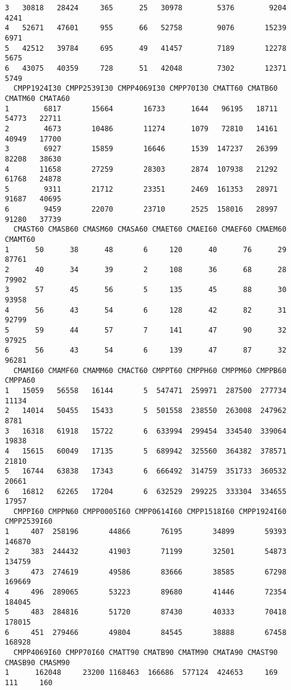 \documentclass[
  letterpaper,
  DIV=11,
  numbers=noendperiod]{scrreprt}
\begin{document}
\begin{verbatim}
3   30818   28424     365      25   30978        5376        9204        4241
4   52671   47601     955      66   52758        9076       15239        6971
5   42512   39784     695      49   41457        7189       12278        5675
6   43075   40359     728      51   42048        7302       12371        5749
  CMPP1924I30 CMPP2539I30 CMPP4069I30 CMPP70I30 CMATT60 CMATB60 CMATM60 CMATA60
1        6817       15664       16733      1644   96195   18711   54773   22711
2        4673       10486       11274      1079   72810   14161   40949   17700
3        6927       15859       16646      1539  147237   26399   82208   38630
4       11658       27259       28303      2874  107938   21292   61768   24878
5        9311       21712       23351      2469  161353   28971   91687   40695
6        9459       22070       23710      2525  158016   28997   91280   37739
  CMAST60 CMASB60 CMASM60 CMASA60 CMAET60 CMAEI60 CMAEF60 CMAEM60 CMAMT60
1      50      38      48       6     120      40      76      29   87761
2      40      34      39       2     108      36      68      28   79902
3      57      45      56       5     135      45      88      30   93958
4      56      43      54       6     128      42      82      31   92799
5      59      44      57       7     141      47      90      32   97925
6      56      43      54       6     139      47      87      32   96281
  CMAMI60 CMAMF60 CMAMM60 CMACT60 CMPPT60 CMPPH60 CMPPM60 CMPPB60 CMPPA60
1   15059   56558   16144       5  547471  259971  287500  277734   11134
2   14014   50455   15433       5  501558  238550  263008  247962    8781
3   16318   61918   15722       6  633994  299454  334540  339064   19838
4   15615   60049   17135       5  689942  325560  364382  378571   21810
5   16744   63838   17343       6  666492  314759  351733  360532   20661
6   16812   62265   17204       6  632529  299225  333304  334655   17957
  CMPPI60 CMPPN60 CMPP0005I60 CMPP0614I60 CMPP1518I60 CMPP1924I60 CMPP2539I60
1     407  258196       44866       76195       34899       59393      146870
2     383  244432       41903       71199       32501       54873      134759
3     473  274619       49586       83666       38585       67298      169669
4     496  289065       53223       89680       41446       72354      184045
5     483  284816       51720       87430       40333       70418      178015
6     451  279466       49804       84545       38888       67458      168928
  CMPP4069I60 CMPP70I60 CMATT90 CMATB90 CMATM90 CMATA90 CMAST90 CMASB90 CMASM90
1      162048     23200 1168463  166686  577124  424653     169     111     160

\end{verbatim}
\end{document}
